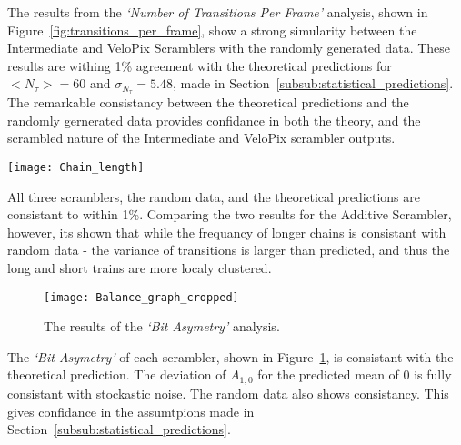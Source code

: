 			The results from the \textit{`Number of Transitions Per Frame'} analysis, shown in Figure~\ref{fig:transitions_per_frame}, show a strong simularity between the Intermediate and VeloPix Scramblers with the randomly generated data. 
			These results are withing 1\% agreement with the theoretical predictions for $<N_\tau> = 60$ and $\sigma_{N_\tau} = 5.48$, made in Section~\ref{subsub:statistical_predictions}. 
			The remarkable consistancy between the theoretical predictions and the randomly gernerated data provides confidance in both the theory, and the scrambled nature of the Intermediate and VeloPix scrambler outputs.
			
			\begin{SCfigure}%
				\centering
				\texttt{[image: Chain\_length]}
				\caption{Results of the \textit{`Common Bit Chain Length'} analysis. The results for the Random Data, Additive Scrambler, Intermediate Scrambler and VeloPix Scrambler approximatly overlap for the \textit{`Common Bit Chain Length'} analysis.}
				\label{fig:chain_length}
			\end{SCfigure}

			All three scramblers, the random data, and the theoretical predictions are consistant to within 1\%. 
			Comparing the two results for the Additive Scrambler, however, its shown that while the frequancy of longer chains is consistant with random data - the variance of transitions is larger than predicted, and thus the long and short trains are more localy clustered. 

			\begin{figure}[ht]
				\centering
				\texttt{[image: Balance\_graph\_cropped]}
				\caption{The results of the \textit{`Bit Asymetry'} analysis.}
				\label{fig:bit_asym}
			\end{figure}
			
			The \textit{`Bit Asymetry'} of each scrambler, shown in Figure~\ref{fig:bit_asym}, is consistant with the theoretical prediction. 
			The deviation of $A_{1,0}$ for the predicted mean of 0 is fully consistant with stockastic noise. 
			The random data also shows consistancy. 
			This gives confidance in the assumtpions made in Section~\ref{subsub:statistical_predictions}.		

